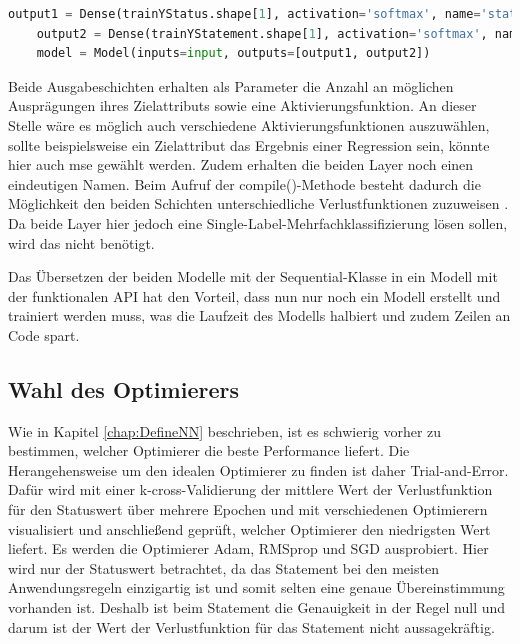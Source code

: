 \begin{lstlisting}[language = python, caption={Zweite Ausgabeschicht hinzufügen},captionpos=b, label = lst:Outputs, floatplacement=H]
    output1 = Dense(trainYStatus.shape[1], activation='softmax', name='status')(x)
    output2 = Dense(trainYStatement.shape[1], activation='softmax', name='statement')(x)
    model = Model(inputs=input, outputs=[output1, output2])
\end{lstlisting}

Beide Ausgabeschichten erhalten als Parameter die Anzahl an möglichen Ausprägungen ihres Zielattributs sowie eine Aktivierungsfunktion. An dieser Stelle wäre es möglich
auch verschiedene Aktivierungsfunktionen auszuwählen, sollte beispielsweise ein Zielattribut das Ergebnis einer Regression sein, könnte hier auch 
\glqq mse\grqq{} gewählt werden. Zudem erhalten die beiden Layer noch einen eindeutigen Namen. Beim Aufruf der compile()-Methode besteht dadurch die Möglichkeit 
den beiden Schichten unterschiedliche Verlustfunktionen zuzuweisen \cite[vgl. S.308f.]{DL_PY}. Da beide Layer hier jedoch eine Single-Label-Mehrfachklassifizierung lösen sollen,
wird das nicht benötigt. 

Das Übersetzen der beiden Modelle mit der \glqq Sequential\grqq{}-Klasse in ein Modell mit der funktionalen \ac{API} hat den Vorteil, dass nun nur noch ein Modell 
erstellt und trainiert werden muss, was die Laufzeit des Modells halbiert und zudem Zeilen an Code spart.

\subsection{Wahl des Optimierers}

Wie in Kapitel \ref*{chap:DefineNN} beschrieben, ist es schwierig vorher zu bestimmen, welcher Optimierer die beste Performance liefert. Die Herangehensweise
um den idealen Optimierer zu finden ist daher Trial-and-Error. Dafür wird mit einer k-cross-Validierung der mittlere Wert der Verlustfunktion für den Statuswert
über mehrere Epochen und mit verschiedenen Optimierern visualisiert und anschließend geprüft, welcher Optimierer den niedrigsten Wert liefert. Es werden die Optimierer 
\glqq Adam\grqq{}, \glqq RMSprop\grqq{} und \glqq SGD\grqq{} ausprobiert.
Hier wird nur der Statuswert betrachtet, da das Statement bei den meisten Anwendungsregeln einzigartig ist und somit selten eine genaue Übereinstimmung vorhanden ist.
Deshalb ist beim Statement die Genauigkeit in der Regel null und darum ist der Wert der Verlustfunktion für das Statement nicht aussagekräftig.

